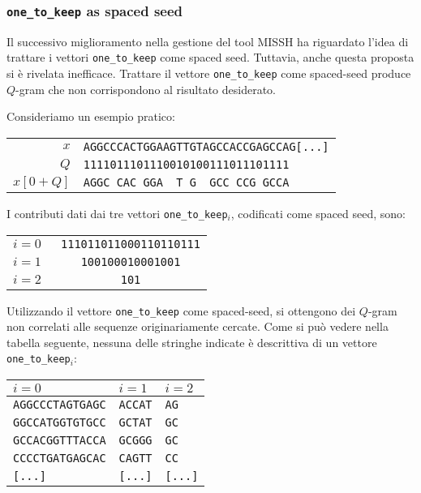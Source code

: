 \subsubsection*{\texttt{one\_to\_keep} as spaced seed}
Il successivo miglioramento nella gestione del tool \acs{MISSH} ha riguardato l'idea di trattare i vettori \verb|one_to_keep| come spaced seed. Tuttavia, anche questa proposta si è rivelata inefficace. Trattare il vettore \verb|one_to_keep| come spaced-seed produce $Q$-gram che non corrispondono al risultato desiderato.

\begin{example}
	Consideriamo un esempio pratico:
	\begin{center}
		\begin{tabular}{r || l}
			$x$ & \texttt{AGGCCCACTGGAAGTTGTAGCCACCGAGCCAG[...]} \\
			$Q$ & \texttt{1111011101110010100111011101111} \\
			$x[0 + Q]$ & \texttt{AGGC\ CAC\ GGA\ \ T\ G\ \ GCC\ CCG\ GCCA} \\
		\end{tabular}
	\end{center}

	I contributi dati dai tre vettori \verb|one_to_keep|$_i$, codificati come spaced seed, sono:
	\begin{center}
		\begin{tabular}{l || l}
			$i = 0$ & \verb| 111011011000110110111| \\
			$i = 1$ & \verb|    100100010001001   | \\
			$i = 2$ & \verb|          101         | \\
		\end{tabular}
	\end{center}

	Utilizzando il vettore \verb|one_to_keep| come spaced-seed, si ottengono dei $Q$-gram non correlati alle sequenze originariamente cercate. Come si può vedere nella tabella seguente, nessuna delle stringhe indicate è descrittiva di un vettore \verb|one_to_keep|$_i$:
	\begin{center}
		\begin{tabular}{l | l | l}	
			$i = 0$ & $i = 1$ & $i = 2$ \\
			\toprule
			\verb|AGGCCCTAGTGAGC| & \verb|ACCAT| & \verb|AG| \\
			\verb|GGCCATGGTGTGCC| & \verb|GCTAT| & \verb|GC| \\
			\verb|GCCACGGTTTACCA| & \verb|GCGGG| & \verb|GC| \\
			\verb|CCCCTGATGAGCAC| & \verb|CAGTT| & \verb|CC| \\
			\verb|[...]| & \verb|[...]| & \verb|[...]| \\
		\end{tabular}
	\end{center}


\end{example}
